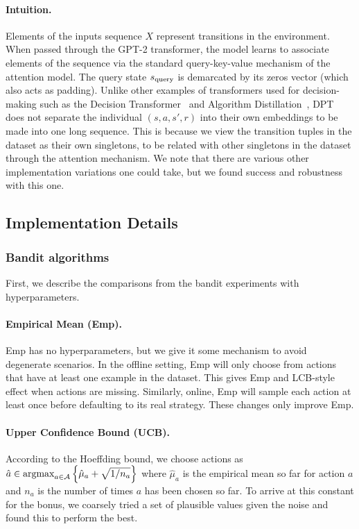 \paragraph{Intuition.} Elements of the inputs sequence $X$ represent transitions in the environment. When passed through the GPT-2 transformer, the model learns to associate elements of the sequence via the standard query-key-value mechanism of the attention model. The query state $s_{\text{query}}$ is demarcated by its zeros vector (which also acts as padding). Unlike other examples of transformers used for decision-making such as the Decision Transformer~\citep{chen2021decision} and Algorithm Distillation~\citep{laskin2022context}, DPT does not separate the individual $(s, a, s', r)$ into their own embeddings to be made into one long sequence. This is because we view the transition tuples in the dataset as their own singletons, to be related with other singletons in the dataset through the attention mechanism. We note that there are various other implementation variations one could take, but we found success and robustness with this one.


\subsection{Implementation Details}
\label{app:comparisons}

\subsubsection{Bandit algorithms}
First, we describe the comparisons from the bandit experiments with hyperparameters.

\paragraph{Empirical Mean (Emp).} Emp has no hyperparameters, but we give it some mechanism to avoid degenerate scenarios.  In the offline setting, Emp will only choose from actions that have at least one example in the dataset. This gives Emp and LCB-style effect when actions are missing. Similarly, online, Emp will sample each action at least once before defaulting to its real strategy. These changes only improve Emp.

\paragraph{Upper Confidence Bound (UCB).}
According to the Hoeffding bound, we choose actions as
$\hat a \in \mathop{\mathrm{argmax}}_{a \in \mathcal{A}} \left\{  \hat \mu_a + \sqrt{1 / n_a} \right\}$
where $\hat \mu_a$ is the empirical mean so far for action $a$ and $n_a$ is the number of times $a$ has been chosen so far. To arrive at this constant for the bonus, we coarsely tried a set of plausible values given the noise and found this to perform the best.

